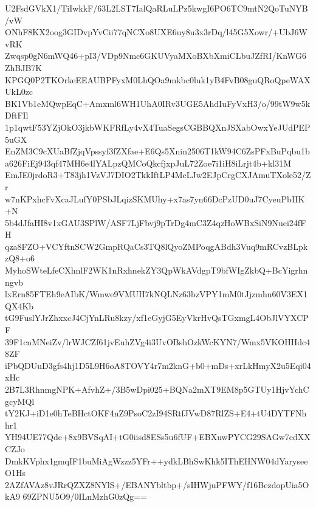 U2FsdGVkX1/TiIwkkF/63L2LST7IalQaRLuLPz5kwgI6PO6TC9mtN2QoTuNYB/vW
ONhF8KX2oog3GIDvpYvCii77qNCXo8UXE6uy8u3x3rDq/l45G5Xowr/+UbJ6WvRK
Zwqsp0gN6mWQ46+pI3/VDp9Nmc6GKUVyaMXoBXbXmiCLbuJZfRI/KnWG6ZhBJB7K
KPGQ0P2TKOrkeEEAUBPFyxM0LhQOa9mkbc0luk1yB4FvB08guQRoQpeWAXUkL0zc
BK1Vb1eMQwpEqC+Amxml6WH1UhA0IRv3UGE5AhdIuFyVxH3/o/99tW9w5kDftFIl
1p1qwtF53YZjOkO3jkbWKFRfLy4vX4TuaSegsCGBBQXnJSXabOwxYeJUdPEP5uGX
EnZM3C9cXUaBfZjqVpssyf3fZXfae+E6Qs5Xnin2506T1kW94C6ZsPFxBuPqbu1b
a626FiEj943qf47MH6e4lYALpzQMCoQkcfjxpJuL72Zoe7i1iH8iLrjt4b+kl31M
EmJE0jrdoR3+T83jh1VzVJ7DIO2TkkIftLP4McLJw2EJpCrgCXJAmuTXole52/Zr
w7nKPxhcFvXcaJLufY0PSbJLqizSKMUhy+x7as7yn66DcPzUD0uJ7CyeuPbIIK+N
5b4dJfaHI8v1xGAU3SPlW/ASF7LjFbvj9pTrDg4mC3Z4qzHoWBxSiN9Nuei24fFH
qza8FZO+VCYftnSCW2GmpRQaCs3TQ8lQyoZMPoqgABdh3Vuq9mRCvzBLpkzQ8+o6
MyhoSWteLfeCXhnlF2WK1nRxhnekZY3QpWkAVdgpT9bfWIgZkbQ+BcYigrhnngvb
lxErn85FTEh9eAIbK/Wmwe9VMUH7kNQLNz63bzVPY1mM0tJjzmhn60V3EX1QX4Kb
tG9FuslYJrZhxxcJ4CjYnLRu8kzy/xf1eGyjG5EyVkrHvQsTGxmgL4ObJlVYXCPF
39F1cnMNeiZv/lrWJCZf61jvEuhZVg4i3UvOBshOzkWcKYN7/Wmx5VKOHHdc48ZF
iPbQDUuD3gfs4hj1D5L9H6oA8TOVY4r7m2knG+b0+mDs+xrLkHmyX2u5Eqi04xHc
2B7L3RhnmgNPK+AfvhZ+/3B5wDpi025+BQNa2mXT9EM8p5GTUy1HjvYchCgcyMQl
tY2KJ+iD1e0hTeBHctOKF4nZ9PsoC2zI94SRtfJVwD87RlZS+E4+tU4DYTFNhhr1
YH94UE77Qde+8x9BVSqAI+tG0iisd8ESs5u6fUF+EBXuwPYCG29SAGw7cdXXCZJo
DmkKVphx1gmqIF1buMiAgWzzz5YFr++ydkLBhSwKhk5IThEHNW04dYaryseeO1Hs
2AZfAVAz8vJRrQZXZ8NYlS+/EBANYbltbp+/sIHWjuPFWY/f16BezdopUia5OkA9
69ZPNU5O9/0ILnMzhG0zQg==
